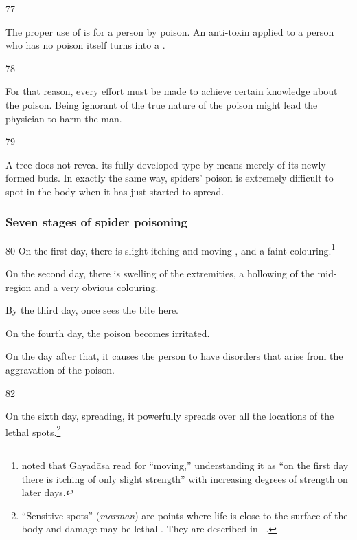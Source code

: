\begin{translation}
\item[77]

The proper use of  is for a person 
by poison. An anti-toxin applied to a person who has no poison itself turns into a 
.

\item[78]

For that reason, every effort must be made to achieve certain knowledge about 
the poison.  Being ignorant of the true nature of the poison might lead the 
physician to harm the man.

\item[79]

A tree does not reveal its fully developed type by means merely of its 
newly formed buds.  In exactly the same way, spiders' poison is extremely 
difficult to spot in the body when it has just started to spread.

\subsubsection{Seven stages of spider poisoning}

\item[80]
On the first day, there is slight itching and moving , 
and a faint colouring.\footnote{ noted that
    Gayadāsa read  for  “moving,” understanding it 
    as “on the first day there is itching of only slight strength” with increasing 
    degrees of strength on later days.}
    
On the second day, there is swelling of the extremities, a hollowing of the 
mid-region and a very obvious colouring.

By the third day, once sees the bite here.

On the fourth day, the poison becomes irritated.

On the day after that, it causes the person to have disorders that arise from the 
aggravation of the poison.

\item[82]

On the sixth day, spreading, it powerfully spreads over all the
locations of the lethal spots.\footnote{ “Sensitive spots”
    (\emph{marman}) are points where life is close to the surface of the
    body and damage may be lethal \citep[201--202, 236--244]{wuja-2003}. 
    They are described in \SS\ .}
    

\end{translation}
